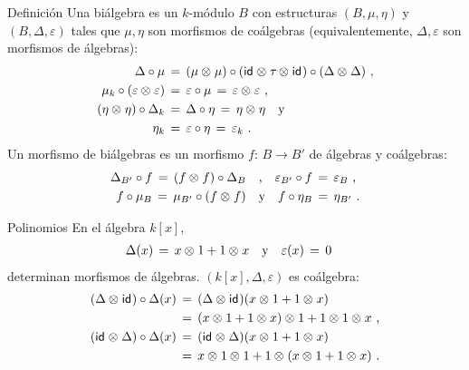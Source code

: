 \begin{frame}{Definici\'{o}n}
	Una bi\'{a}lgebra es un $k$-m\'{o}dulo $B$ con estructuras
	$(B,\mu,\eta)$ y $(B,\Delta,\varepsilon)$ tales que
	$\mu,\eta$ son morfismos de co\'{a}lgebras (equivalentemente,
	$\Delta,\varepsilon$ son morfismos de \'{a}lgebras):
	\begin{align*}
		\Delta\circ\mu & \,=\,
			(\mu\otimes_{}\mu)\circ (\mathsf{id}_{}\otimes_{}\tau_{}\otimes_{}\mathsf{id}_{})\circ
				(\Delta\otimes_{}\Delta)
				\text{ ,} \\
		\mu_k\circ (\varepsilon\otimes_{}\varepsilon) & \,=\,
			\varepsilon\circ\mu \,=\,\varepsilon\otimes_{}\varepsilon
			\text{ ,} \\
		(\eta\otimes_{}\eta)\circ\Delta_k & \,=\,\Delta\circ\eta \,=\,
			\eta\otimes_{}\eta	\quad\text{y} \\
		\eta_k & \,=\,\varepsilon\circ\eta\,=\,\varepsilon_k
		\text{ .}
	\end{align*}
	Un morfismo de bi\'{a}lgebras es un morfismo $f:\,B\rightarrow B'$ de
	\'{a}lgebras y co\'{a}lgebras:
	\begin{align*}
		\Delta_{B'}\circ f \,=\,(f\otimes_{} f)\circ\Delta_B
			& \quad\text{,}\quad
			\varepsilon_{B'}\circ f \,=\,\varepsilon_B
			\text{ ,} \\
		f\circ\mu_B \,=\,\mu_{B'}\circ (f\otimes_{} f)
			& \quad\text{y}\quad
			f\circ\eta_B \,=\,\eta_{B'}
		\text{ .}
	\end{align*}
\end{frame}

\begin{frame}{Polinomios}
	En el \'{a}lgebra $k[x]$,
	\begin{align*}
		\Delta(x) \,=\,x\otimes_{} 1 + 1\otimes_{} x
			& \quad\text{y}\quad \varepsilon(x)\,=\,0
	\end{align*}
	determinan morfismos de \'{a}lgebras. $(k[x],\Delta,\varepsilon)$ es
	co\'{a}lgebra:
	\begin{align*}
		(\Delta\otimes_{}\mathsf{id}_{})\circ\Delta(x) & \,=\,
			(\Delta\otimes_{}\mathsf{id}_{})(x\otimes_{} 1 + 1\otimes_{} x) \\
		& \,=\,(x\otimes_{} 1 + 1\otimes_{} x)\otimes_{} 1 + 1\otimes_{} 1\otimes_{} x
			\text{ ,} \\
		(\mathsf{id}_{}\otimes_{}\Delta)\circ\Delta(x) & \,=\,
			(\mathsf{id}_{}\otimes_{}\Delta)(x\otimes_{} 1 + 1\otimes_{} x) \\
		& \,=\,x\otimes_{} 1\otimes_{} 1 + 1\otimes_{} (x\otimes_{} 1 + 1\otimes_{} x)
		\text{ .}
	\end{align*}
\end{frame}

